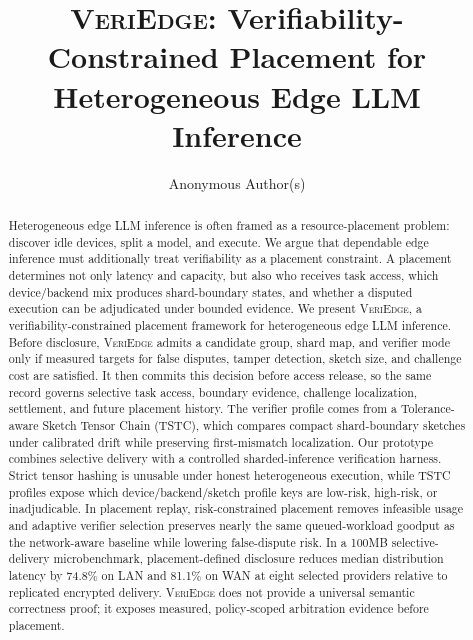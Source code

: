 \documentclass[sigplan,screen,review,anonymous]{acmart}
\newcommand{\system}{\textsc{VeriEdge}\xspace}
\begin{document}
\title{\system: Verifiability-Constrained Placement for Heterogeneous Edge LLM Inference}

\author{Anonymous Author(s)}

\begin{abstract}
	Heterogeneous edge LLM inference is often framed as a resource-placement
	problem: discover idle devices, split a model, and execute. We argue that
	dependable edge inference must additionally treat verifiability as a
	placement constraint. A placement determines not only latency and capacity,
	but also who receives task access, which device/backend mix produces
	shard-boundary states, and whether a disputed execution can be adjudicated
	under bounded evidence.
	We present \system, a verifiability-constrained placement framework for
	heterogeneous edge LLM inference. Before disclosure, \system admits a
	candidate group, shard map, and verifier mode only if measured targets for
	false disputes, tamper detection, sketch size, and challenge cost are
	satisfied. It then commits this decision before access release, so the same
	record governs selective task access, boundary evidence, challenge
	localization, settlement, and future placement history. The verifier profile
	comes from a Tolerance-aware Sketch Tensor Chain (TSTC), which compares
	compact shard-boundary sketches under calibrated drift while preserving
	first-mismatch localization.
	Our prototype combines selective delivery with a controlled sharded-inference
	verification harness. Strict tensor hashing is unusable under honest
heterogeneous execution, while TSTC profiles expose which
device/backend/sketch profile keys are low-risk, high-risk, or inadjudicable.
	In placement replay, risk-constrained placement removes infeasible usage and
	adaptive verifier selection preserves nearly the same queued-workload
	goodput as the network-aware baseline while lowering false-dispute risk.
	In a 100MB selective-delivery
	microbenchmark, placement-defined disclosure reduces median distribution
	latency by 74.8\% on LAN and 81.1\% on WAN at eight selected providers
	relative to replicated encrypted delivery. \system does not provide a universal semantic correctness proof;
	it exposes measured, policy-scoped arbitration evidence before placement.
\end{abstract}

\end{document}
